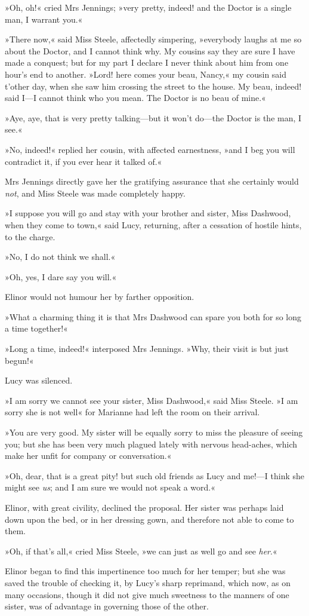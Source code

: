 »Oh, oh!« cried Mrs Jennings; »very pretty, indeed! and the Doctor is a single man, I warrant you.«

»There now,« said Miss Steele, affectedly simpering, »everybody laughs at me so about the Doctor, and I cannot think why. My cousins say they are sure I have made a conquest; but for my part I declare I never think about him from one hour’s end to another. »Lord! here comes your beau, Nancy,« my cousin said t’other day, when she saw him crossing the street to the house. My beau, indeed! said I—I cannot think who you mean. The Doctor is no beau of mine.«

»Aye, aye, that is very pretty talking—but it won’t do—the Doctor is the man, I see.«

»No, indeed!« replied her cousin, with affected earnestness, »and I beg you will contradict it, if you ever hear it talked of.«

Mrs Jennings directly gave her the gratifying assurance that she certainly would \textit{not}, and Miss Steele was made completely happy.

»I suppose you will go and stay with your brother and sister, Miss Dashwood, when they come to town,« said Lucy, returning, after a cessation of hostile hints, to the charge.

»No, I do not think we shall.«

»Oh, yes, I dare say you will.«

Elinor would not humour her by farther opposition.

»What a charming thing it is that Mrs Dashwood can spare you both for so long a time together!«

»Long a time, indeed!« interposed Mrs Jennings. »Why, their visit is but just begun!«

Lucy was silenced.

»I am sorry we cannot see your sister, Miss Dashwood,« said Miss Steele. »I am sorry she is not well\longdash« for Marianne had left the room on their arrival.

»You are very good. My sister will be equally sorry to miss the pleasure of seeing you; but she has been very much plagued lately with nervous head-aches, which make her unfit for company or conversation.«

»Oh, dear, that is a great pity! but such old friends as Lucy and me!—I think she might see \textit{us}; and I am sure we would not speak a word.«

Elinor, with great civility, declined the proposal. Her sister was perhaps laid down upon the bed, or in her dressing gown, and therefore not able to come to them.

»Oh, if that’s all,« cried Miss Steele, »we can just as well go and see \textit{her}.«

Elinor began to find this impertinence too much for her temper; but she was saved the trouble of checking it, by Lucy’s sharp reprimand, which now, as on many occasions, though it did not give much sweetness to the manners of one sister, was of advantage in governing those of the other.